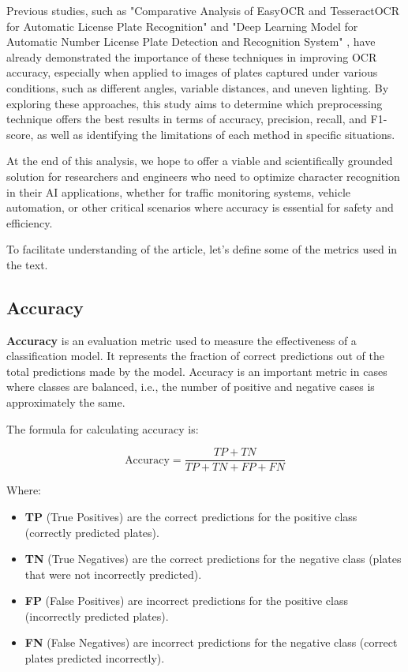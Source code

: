 \documentclass[conference]{IEEEtran}
\begin{document}
    Previous studies, such as "Comparative Analysis of EasyOCR and TesseractOCR for Automatic License Plate Recognition" \cite{b1} and "Deep Learning Model for Automatic Number License Plate Detection and Recognition System" \cite{b2}, have already demonstrated the importance of these techniques in improving OCR accuracy, especially when applied to images of plates captured under various conditions, such as different angles, variable distances, and uneven lighting. By exploring these approaches, this study aims to determine which preprocessing technique offers the best results in terms of accuracy, precision, recall, and F1-score, as well as identifying the limitations of each method in specific situations.
    
    At the end of this analysis, we hope to offer a viable and scientifically grounded solution for researchers and engineers who need to optimize character recognition in their AI applications, whether for traffic monitoring systems, vehicle automation, or other critical scenarios where accuracy is essential for safety and efficiency.
    
    To facilitate understanding of the article, let's define some of the metrics used in the text.
    
    \subsection{Accuracy}
    
    \textbf{Accuracy} is an evaluation metric used to measure the effectiveness of a classification model. It represents the fraction of correct predictions out of the total predictions made by the model. Accuracy is an important metric in cases where classes are balanced, i.e., the number of positive and negative cases is approximately the same.
    
    The formula for calculating accuracy is:
    
    \[
    \text{Accuracy} = \frac{TP + TN}{TP + TN + FP + FN}
    \]
    
    Where:
    
    \begin{itemize}
        \item \textbf{TP} (True Positives) are the correct predictions for the positive class (correctly predicted plates).
        \item \textbf{TN} (True Negatives) are the correct predictions for the negative class (plates that were not incorrectly predicted).
        \item \textbf{FP} (False Positives) are incorrect predictions for the positive class (incorrectly predicted plates).
        \item \textbf{FN} (False Negatives) are incorrect predictions for the negative class (correct plates predicted incorrectly).
    \end{itemize}
    
\end{document}
